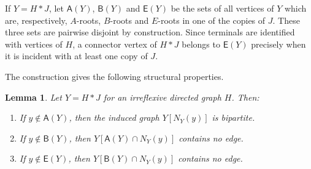 \documentclass[11pt]{amsart}
\theoremstyle{plain}
\newtheorem{lemma}[theorem]{Lemma}
\theoremstyle{definition}
\newcommand{\Aset}{\mathsf A}
\newcommand{\Bset}{\mathsf B}
\newcommand{\Eset}{\mathsf E}
\begin{document}
If $Y=H*J$, let $\Aset(Y)$, $\Bset(Y)$ and $\Eset(Y)$ be the sets of all vertices of $Y$ which are, respectively, $A$-roots, $B$-roots and $E$-roots in one of the copies of $J$.  These three sets are pairwise disjoint by construction.  Since terminals are identified with vertices of $H$, a connector vertex of $H*J$ belongs to $\Eset(Y)$ precisely when it is incident with at least one copy of $J$.

The construction gives the following structural properties.


\begin{lemma}\label{lem:structural-color}
Let $Y=H*J$ for an irreflexive directed graph $H$.  Then:
\begin{enumerate}[label=\textup{(\roman*)}]
\item If $y\notin \Aset(Y)$, then the induced graph $Y[N_Y(y)]$ is bipartite.
\item If $y\notin \Bset(Y)$, then $Y[\Aset(Y)\cap N_Y(y)]$ contains no edge.
\item If $y\notin \Eset(Y)$, then $Y[\Bset(Y)\cap N_Y(y)]$ contains no edge.
\end{enumerate}
\end{lemma}
\end{document}

